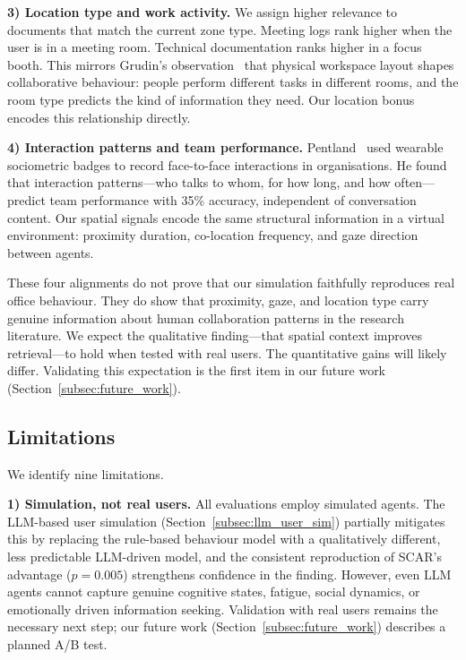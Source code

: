 \documentclass[journal]{IEEEtran}
\begin{document}
\textbf{3) Location type and work activity.}
We assign higher relevance to documents that match the current zone
type. Meeting logs rank higher when the user is in a meeting room.
Technical documentation ranks higher in a focus booth. This mirrors
Grudin's observation~\cite{grudin1994groupware} that physical
workspace layout shapes collaborative behaviour: people perform
different tasks in different rooms, and the room type predicts
the kind of information they need. Our location bonus encodes
this relationship directly.

\textbf{4) Interaction patterns and team performance.}
Pentland~\cite{pentland_badges} used wearable sociometric
badges to record face-to-face interactions in organisations. He found
that interaction patterns---who talks to whom, for how long, and
how often---predict team performance with 35\% accuracy, independent
of conversation content. Our spatial signals encode the same
structural information in a virtual environment: proximity duration,
co-location frequency, and gaze direction between agents.

These four alignments do not prove that our simulation faithfully
reproduces real office behaviour. They do show that proximity, gaze,
and location type carry genuine information about human collaboration
patterns in the research literature. We expect the qualitative
finding---that spatial context improves retrieval---to hold when
tested with real users. The quantitative gains will likely differ.
Validating this expectation is the first item in our future work
(Section~\ref{subsec:future_work}).

\subsection{Limitations}
\label{subsec:limitations}

We identify nine limitations.

\textbf{1) Simulation, not real users.}
All evaluations employ simulated agents. The LLM-based user simulation (Section~\ref{subsec:llm_user_sim}) partially mitigates this by replacing the rule-based behaviour model with a qualitatively different, less predictable LLM-driven model, and the consistent reproduction of SCAR's advantage ($p = 0.005$) strengthens confidence in the finding. However, even LLM agents cannot capture genuine cognitive states, fatigue, social dynamics, or emotionally driven information seeking. Validation with real users remains the necessary next step; our future work (Section~\ref{subsec:future_work}) describes a planned A/B test.
\end{document}
